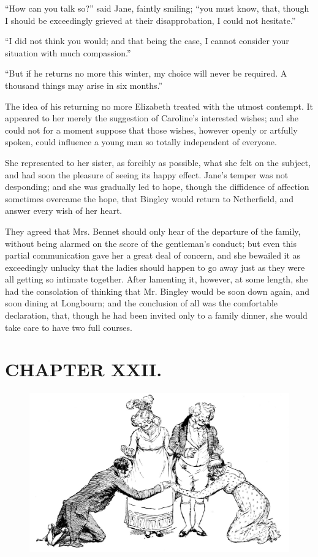 ``How can you talk so?'' said Jane, faintly smiling; ``you must know, that, though I should be exceedingly grieved at their disapprobation, I could not hesitate.''

``I did not think you would; and that being the case, I cannot consider your situation with much compassion.''

``But if he returns no more this winter, my choice will never be required. A thousand things may arise in six months.''

The idea of his returning no more Elizabeth treated with the utmost contempt. It appeared to her merely the suggestion of Caroline's interested wishes; and she could not for a moment suppose that those wishes, however openly or artfully spoken, could influence a young man so totally independent of everyone.

She represented to her sister, as forcibly as possible, what she felt on the subject, and had soon the pleasure of seeing its happy effect. Jane's temper was not desponding; and she was gradually led to hope, though the diffidence of affection sometimes overcame the hope, that Bingley would return to Netherfield, and answer every wish of her heart.

They agreed that Mrs. Bennet should only hear of the departure of the family, without being alarmed on the score of the gentleman's conduct; but even this partial communication gave her a great deal of concern, and she bewailed it as exceedingly unlucky that the ladies should happen to go away just as they were all getting so intimate together. After lamenting it, however, at some length, she had the consolation of thinking that Mr. Bingley would be soon down again, and soon dining at Longbourn; and the conclusion of all was the comfortable declaration, that, though he had been invited only to a family dinner, she would take care to have two full courses.

\chapter{CHAPTER XXII.}

\begin{figure}[htbp]
    \centering
    \includegraphics[width=\textwidth]{illustrations/i_183_a.jpg}
\end{figure}


